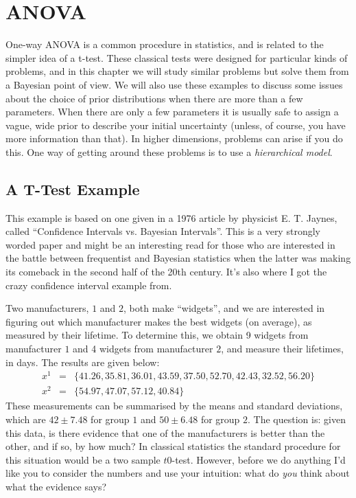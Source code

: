 \chapter{ANOVA}
One-way ANOVA is a common procedure in statistics, and is related to the
simpler idea of a t-test. These classical tests were designed for particular
kinds of problems, and in this chapter we will study similar problems but
solve them from a Bayesian point of view.
We will also use these examples to discuss some issues about the choice
of prior distributions when there are more than a few parameters. When there
are only a few parameters it is usually safe to assign a vague, wide prior
to describe your initial uncertainty (unless, of course, you have more
information than that). In higher dimensions, problems can arise if you do
this. One way of getting around these problems is to use a
{\it hierarchical model}.

\section{A T-Test Example}
This example is based on one given in a 1976 article by physicist E. T. Jaynes,
called ``Confidence Intervals vs. Bayesian Intervals''. This is a very strongly
worded paper and might be an interesting read for
those who are interested in the battle between frequentist and Bayesian statistics
when the latter was making its comeback in the second half of the 20th century.
It's also where I got the crazy confidence interval example from.

Two manufacturers, $1$ and $2$, both make ``widgets'', and we are interested
in figuring out which manufacturer makes the best widgets (on average), as
measured by their lifetime. To determine this, we obtain 9 widgets from
manufacturer $1$ and 4 widgets from manufacturer $2$, and measure their
lifetimes, in days. The results are given below:
\begin{eqnarray}
x^1 &=& \{41.26, 35.81, 36.01, 43.59, 37.50, 52.70, 42.43, 32.52, 56.20\}\\
x^2 &=& \{54.97, 47.07, 57.12, 40.84\}
\end{eqnarray}
These measurements can be summarised by the means and standard deviations, which
are $42 \pm 7.48$ for group $1$ and $50 \pm 6.48$ for group $2$.
The question is: given this data, is there evidence that one of the manufacturers
is better than the other, and if so, by how much?
In classical statistics the standard procedure for this situation would be a
two sample $t$0-test. However, before we do anything I'd like you to consider
the numbers and use your intuition: what do {\it you} think about what the
evidence says?

